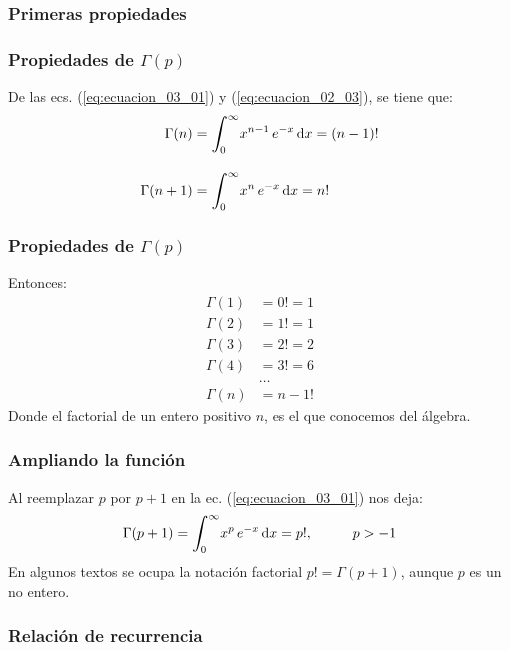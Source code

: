\documentclass[12pt]{beamer}
\begin{document}
\subsubsection{Primeras propiedades}

\begin{frame}
\frametitle{Propiedades de $\Gamma (p)$}
De las ecs. (\ref{eq:ecuacion_03_01}) y (\ref{eq:ecuacion_02_03}), se tiene que:
\pause
\begin{align}
\begin{aligned}
\Gamma (n) &= \scaleint{6ex}_{\bs 0}^{\infty} x^{n-1} \, e^{-x} \dd{x} = (n -1)! \\[1em]
\Gamma (n+1) &= \scaleint{6ex}_{\bs 0}^{\infty} x^{n} \, e^{-x} \dd{x} = n!
\end{aligned}
\label{eq:ecuacion_03_02}
\end{align}
\end{frame}
\begin{frame}
\frametitle{Propiedades de $\Gamma (p)$}
Entonces:
\pause
\begin{align*}
\Gamma (1) &= 0! = 1 \\
\Gamma (2) &= 1! = 1 \\
\Gamma (3) &= 2! = 2 \\
\Gamma (4) &= 3! = 6 \\
&\ldots \\
\Gamma (n) &= n-1!
\end{align*}
Donde el factorial de un entero positivo $n$, es el que conocemos del álgebra.
\end{frame}
\begin{frame}
\frametitle{Ampliando la función}
Al reemplazar $p$ por $p+1$ en la ec. (\ref{eq:ecuacion_03_01}) nos deja:
\pause
\begin{align}
\Gamma (p + 1) = \scaleint{6ex}_{\bs 0}^{\infty} x^{p} \, e^{-x} \dd{x} = p!, \hspace{1cm} p > -1
\label{eq:ecuacion_03_03}
\end{align}
En algunos textos se ocupa la notación factorial $p! = \Gamma (p + 1)$, aunque $p$ es un no entero.
\end{frame}

\subsubsection{Relación de recurrencia}
\end{document}
